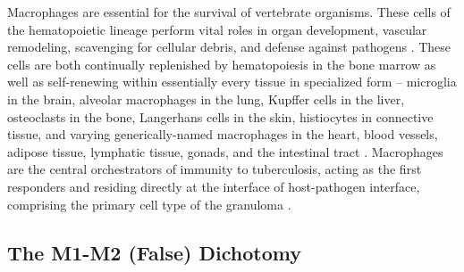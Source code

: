 Macrophages are essential for the survival of vertebrate organisms. These cells of the hematopoietic lineage perform vital roles in organ development, vascular remodeling, scavenging for cellular debris, and defense against pathogens \citep{Wynn2013}. These cells are both continually replenished by hematopoiesis in the bone marrow as well as self\hyp{}renewing within essentially every tissue in specialized form -- microglia in the brain, alveolar macrophages in the lung, Kupffer cells in the liver, osteoclasts in the bone, Langerhans cells in the skin, histiocytes in connective tissue, and varying generically\hyp{}named macrophages in the heart, blood vessels, adipose tissue, lymphatic tissue, gonads, and the intestinal tract \citep{Davies2013a, Na2019, Bain2018}. Macrophages are the central orchestrators of immunity to tuberculosis, acting as the first responders and residing directly at the interface of host\hyp{}pathogen interface, comprising the primary cell type of the granuloma \citep{Pagan2018}. 

\subsection{The M1\hyp{}M2 (False) Dichotomy}\label{lies}

